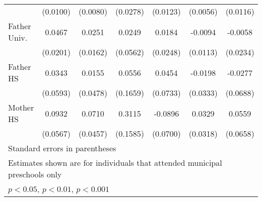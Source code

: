 \begin{table}[htbp]
\begin{tabular}{l*{6}{c}}
            &    (0.0100)         &    (0.0080)         &    (0.0278)         &    (0.0123)         &    (0.0056)         &    (0.0116)         \\
\addlinespace
Father Univ.&      0.0467\sym{*}  &      0.0251         &      0.0249         &      0.0184         &     -0.0094         &     -0.0058         \\
            &    (0.0201)         &    (0.0162)         &    (0.0562)         &    (0.0248)         &    (0.0113)         &    (0.0234)         \\
\addlinespace
Father HS   &      0.0343         &      0.0155         &      0.0556         &      0.0454         &     -0.0198         &     -0.0277         \\
            &    (0.0593)         &    (0.0478)         &    (0.1659)         &    (0.0733)         &    (0.0333)         &    (0.0688)         \\
\addlinespace
Mother HS   &      0.0932         &      0.0710         &      0.3115\sym{*}  &     -0.0896         &      0.0329         &      0.0559         \\
            &    (0.0567)         &    (0.0457)         &    (0.1585)         &    (0.0700)         &    (0.0318)         &    (0.0658)         \\
\bottomrule
\multicolumn{7}{l}{\footnotesize Standard errors in parentheses}\\
\multicolumn{7}{l}{\footnotesize Estimates shown are for individuals that attended municipal preschools only}\\
\multicolumn{7}{l}{\footnotesize \sym{*} \(p<0.05\), \sym{**} \(p<0.01\), \sym{***} \(p<0.001\)}\\
\end{tabular}
\end{table}
